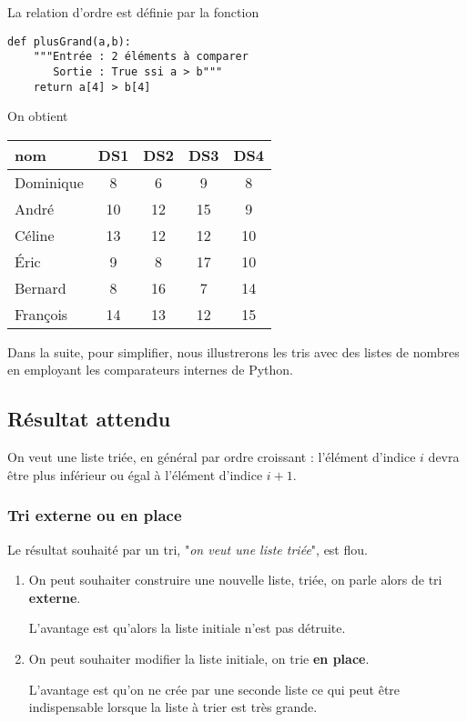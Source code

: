 La relation d'ordre est définie par la fonction
\begin{lstlisting}
def plusGrand(a,b):
    """Entrée : 2 éléments à comparer
       Sortie : True ssi a > b"""
    return a[4] > b[4]
\end{lstlisting}
On obtient 
\begin{center}
\begin{tabular}{l|cccc}
nom       & DS1 & DS2 & DS3 & DS4 \\
\hline
Dominique &  8 &  6 &  9 &  8 \\ 
André     & 10 & 12 & 15 &  9 \\ 
Céline    & 13 & 12 & 12 & 10 \\ 
Éric      &  9 &  8 & 17 & 10 \\ 
Bernard   &  8 & 16 &  7 & 14 \\ 
François  & 14 & 13 & 12 & 15 \\ 
\end{tabular}
\end{center}
Dans la suite, pour simplifier, nous illustrerons les tris avec des listes de nombres en employant les comparateurs internes de Python. 
\subsection{Résultat attendu}
On veut une liste triée, en général par ordre croissant : l'élément d'indice $i$ devra être plus inférieur ou égal à l'élément d'indice $i+1$.
\subsubsection{Tri externe ou en place}
Le résultat souhaité par un tri, "{\it on veut une liste triée}", est flou.

\begin{enumerate}
\item On peut souhaiter construire une nouvelle liste, triée, on parle alors de tri {\bf externe}.

L'avantage est qu'alors la liste initiale n'est pas détruite.

\item On peut souhaiter modifier la liste initiale, on trie {\bf en place}.

L'avantage est qu'on ne crée par une seconde liste ce qui peut être indispensable lorsque la liste à trier est très grande.
\end{enumerate}

